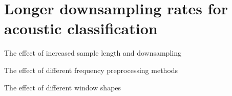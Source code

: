 \chapter{Longer downsampling rates for acoustic classification
\label{chap:acoustic_extension}}

The effect of increased sample length and downsampling

The effect of different frequency preprocessing methods

The effect of different window shapes

